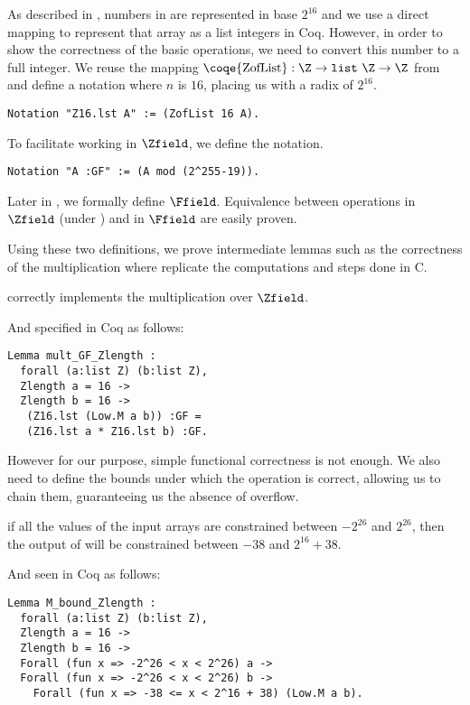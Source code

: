 As described in , numbers in  are represented
in base $2^{16}$ and we use a direct mapping to represent that array as a list
integers in Coq. However, in order to show the correctness of the basic operations,
we need to convert this number to a full integer.
We reuse the mapping
$\text{\coqe{ZofList}} : \Z \rightarrow \texttt{list}~\Z \rightarrow \Z$ from 
and define a notation where $n$ is $16$, placing us with a radix of $2^{16}$.
\begin{lstlisting}[language=Coq]
Notation "Z16.lst A" := (ZofList 16 A).
\end{lstlisting}
To facilitate working in $\Zfield$, we define the  notation.
\begin{lstlisting}[language=Coq]
Notation "A :GF" := (A mod (2^255-19)).
\end{lstlisting}
Later in , we formally define $\Ffield$.
Equivalence between operations in $\Zfield$ (\ie under ) and in $\Ffield$ are easily proven.

Using these two definitions, we prove intermediate lemmas such as the correctness of the
multiplication  where  replicate the computations and steps done in C.
\begin{lemma}
  \label{lemma:mult_correct}
   correctly implements the multiplication over $\Zfield$.
\end{lemma}
And specified in Coq as follows:
\begin{lstlisting}[language=Coq]
Lemma mult_GF_Zlength :
  forall (a:list Z) (b:list Z),
  Zlength a = 16 ->
  Zlength b = 16 ->
   (Z16.lst (Low.M a b)) :GF =
   (Z16.lst a * Z16.lst b) :GF.
\end{lstlisting}

However for our purpose, simple functional correctness is not enough.
We also need to define the bounds under which the operation is correct,
allowing us to chain them, guaranteeing us the absence of overflow.

\begin{lemma}
  \label{lemma:mult_bounded}
  if all the values of the input arrays are constrained between $-2^{26}$ and $2^{26}$,
  then the output of  will be constrained between $-38$ and $2^{16} + 38$.
\end{lemma}
And seen in Coq as follows:
\begin{lstlisting}[language=Coq]
Lemma M_bound_Zlength :
  forall (a:list Z) (b:list Z),
  Zlength a = 16 ->
  Zlength b = 16 ->
  Forall (fun x => -2^26 < x < 2^26) a ->
  Forall (fun x => -2^26 < x < 2^26) b ->
    Forall (fun x => -38 <= x < 2^16 + 38) (Low.M a b).
\end{lstlisting}





